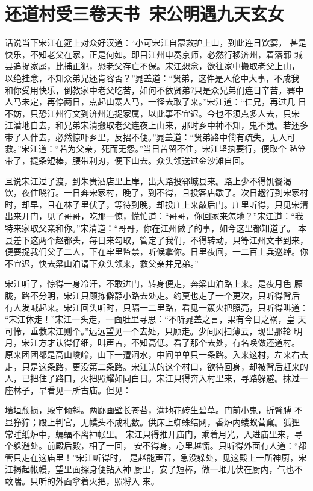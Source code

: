\chapter{还道村受三卷天书~宋公明遇九天玄女}

话说当下宋江在筵上对众好汉道：“小可宋江自蒙救护上山，到此连日饮宴，
甚是快乐，不知老父在家，正是何如。即目江州申奏京师，必然行移济州，着落郓
城县追捉家属，比捕正犯，恐老父存亡不保。宋江想念，欲往家中搬取老父上山，
以绝挂念，不知众弟兄还肯容否？”晁盖道：“贤弟，这件是人伦中大事，不成我
和你受用快乐，倒教家中老父吃苦，如何不依贤弟?只是众兄弟们连日辛苦，寨中
人马未定，再停两日，点起山寨人马，一径去取了来。”宋江道：“仁兄，再过几
日不妨，只恐江州行文到济州追捉家属，以此事不宜迟。今也不须点多人去，只宋
江潜地自去，和兄弟宋清搬取老父连夜上山来，那时乡中神不知，鬼不觉。若还多
带了人伴去，必然惊吓乡里，反招不便。”晁盖道：“贤弟路中倘有疏失，无人可
救。”宋江道：“若为父亲，死而无怨。”当日苦留不住，宋江坚执要行，便取个
毡笠带了，提条短棒，腰带利刃，便下山去。众头领送过金沙滩自回。

且说宋江过了渡，到朱贵酒店里上岸，出大路投郓城县来。路上少不得饥餐渴
饮，夜住晓行。一日奔宋家村，晚了，到不得，且投客店歇了。次日趱行到宋家村
时，却早，且在林子里伏了，等待到晚，却投庄上来敲后门。庄里听得，只见宋清
出来开门，见了哥哥，吃那一惊，慌忙道：“哥哥，你回家来怎地？”宋江道：“我
特来家取父亲和你。”宋清道：“哥哥，你在江州做了的事，如今这里都知道了。
本县差下这两个赵都头，每日来勾取，管定了我们，不得转动，只等江州文书到来，
便要捉我们父子二人，下在牢里监禁，听候拿你。日里夜间，一二百土兵巡绰。你
不宜迟，快去梁山泊请下众头领来，救父亲并兄弟。”

宋江听了，惊得一身冷汗，不敢进门，转身便走，奔梁山泊路上来。是夜月色
朦胧，路不分明，宋江只顾拣僻静小路去处走。约莫也走了一个更次，只听得背后
有人发喊起来。宋江回头听时，只隔一二里路，看见一簇火把照亮，只听得叫道：
“宋江休走！”宋江一头走，一面肚里寻思：“不听晁盖之言，果有今日之祸，皇
天可怜，垂救宋江则个。”远远望见一个去处，只顾走。少间风扫薄云，现出那轮
明月，宋江方才认得仔细，叫声苦，不知高低。看了那个去处，有名唤做还道村。
原来团团都是高山峻岭，山下一遭涧水，中间单单只一条路。入来这村，左来右去
走，只是这条路，更没第二条路。宋江认的这个村口，欲待回身，却被背后赶来的
人，已把住了路口，火把照耀如同白日。宋江只得奔入村里来，寻路躲避。抹过一
座林子，早看见一所古庙。但见：

墙垣颓损，殿宇倾斜。两廊画壁长苍苔，满地花砖生碧草。门前小鬼，折臂膊
不显狰狞；殿上判官，无幞头不成礼数。供床上蜘蛛结网，香炉内蝼蚁营窠。狐狸
常睡纸炉中，蝙蝠不离神帐里。
宋江只得推开庙门，乘着月光，入进庙里来，寻个躲避处。前殿后殿，相了一回，
安不得身，心里越慌。只听得外面有人道：“都管只走在这庙里！”宋江听得时，
是赵能声音，急没躲处，见这殿上一所神厨，宋江揭起帐幔，望里面探身便钻入神
厨里，安了短棒，做一堆儿伏在厨内，气也不敢喘。只听的外面拿着火把，照将入
来。

